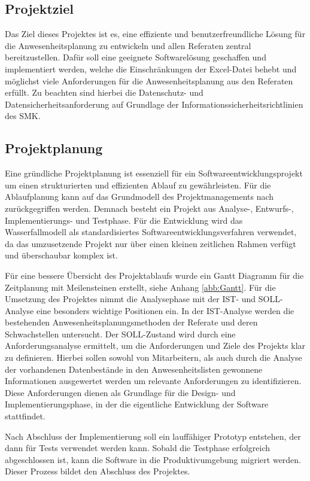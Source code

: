\subsection{Projektziel}
\label{sec:Projektziel}

Das Ziel dieses Projektes ist es, eine effiziente und benutzerfreundliche Lösung für die Anwesenheitsplanung zu entwickeln und allen Referaten zentral bereitzustellen. Dafür soll eine geeignete Softwarelösung geschaffen und implementiert werden, welche die Einschränkungen der Excel-Datei behebt und möglichst viele Anforderungen für die Anwesenheitsplanung aus den Referaten erfüllt. Zu beachten sind hierbei die Datenschutz- und Datensicherheitsanforderung auf Grundlage der Informationssicherheitsrichtlinien des SMK.

\subsection{Projektplanung}
\label{sec:Projektplanung}

Eine gründliche Projektplanung ist essenziell für ein Softwareentwicklungsprojekt um einen strukturierten und effizienten Ablauf zu gewährleisten. Für die Ablaufplanung kann auf das Grundmodell des Projektmanagements nach \cite[S.225]{dehler-2013} zurückgegriffen werden. Demnach besteht ein Projekt aus Analyse-, Entwurfs-, Implementierungs- und Testphase. Für die Entwicklung wird das Wasserfallmodell als standardisiertes Softwareentwicklungsverfahren verwendet, da das umzusetzende Projekt nur über einen kleinen zeitlichen Rahmen verfügt und überschaubar komplex ist.

Für eine bessere Übersicht des Projektablaufs wurde ein Gantt Diagramm für die Zeitplanung mit Meilensteinen erstellt, siehe Anhang \ref{abb:Gantt}. Für die Umsetzung des Projektes nimmt die Analysephase mit der IST- und SOLL-Analyse eine besonders wichtige Positionen ein. In der IST-Analyse werden die bestehenden Anwesenheitsplanungsmethoden der Referate und deren Schwachstellen untersucht. Der SOLL-Zustand wird durch eine Anforderungsanalyse ermittelt, um die Anforderungen und Ziele des Projekts klar zu definieren. Hierbei sollen sowohl von Mitarbeitern, als auch durch die Analyse der vorhandenen Datenbestände in den Anwesenheitslisten gewonnene Informationen ausgewertet werden um relevante Anforderungen zu identifizieren. Diese Anforderungen dienen als Grundlage für die Design- und Implementierungsphase, in der die eigentliche Entwicklung der Software stattfindet.

Nach Abschluss der Implementierung soll ein lauffähiger Prototyp entstehen, der dann für Tests verwendet werden kann. Sobald die Testphase erfolgreich abgeschlossen ist, kann die Software in die Produktivumgebung migriert werden. Dieser Prozess bildet den Abschluss des Projektes.


